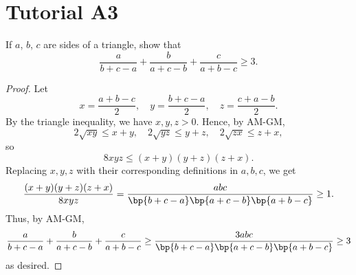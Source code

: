 \section{Tutorial A3}

\begin{problem}
    If $a$, $b$, $c$ are sides of a triangle, show that \[\frac{a}{b+c-a} + \frac{b}{a+c-b} + \frac{c}{a + b - c} \geq 3.\]
\end{problem}
\begin{proof}
    Let \[x = \frac{a + b - c}2, \quad y = \frac{b + c - a}2, \quad z = \frac{c + a - b}2.\] By the triangle inequality, we have $x, y, z > 0$. Hence, by AM-GM, \[2\sqrt{xy} \leq x + y, \quad 2\sqrt{yz} \leq y + z, \quad 2\sqrt{zx} \leq z + x,\] so \[8xyz \leq (x+y)(y+z)(z+x).\] Replacing $x, y, z$ with their corresponding definitions in $a, b, c$, we get \[\frac{(x+y)(y+z)(z+x)}{8xyz} = \frac{abc}{\bp{b + c - a} \bp{a + c - b} \bp{a + b - c}} \geq 1.\] Thus, by AM-GM, \[\frac{a}{b+c-a} + \frac{b}{a+c-b} + \frac{c}{a + b - c} \geq \frac{3abc}{\bp{b + c - a} \bp{a + c - b} \bp{a + b - c}} \geq 3\] as desired.
\end{proof}

